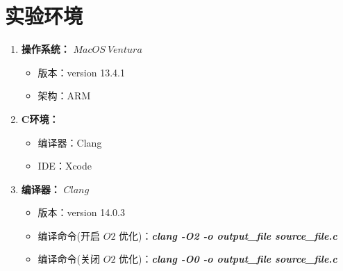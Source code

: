 \section{实验环境}
\begin{enumerate}
    \item \textbf{操作系统：} $MacOS \ Ventura$
    \begin{itemize}
        \item 版本：version 13.4.1
        \item 架构：ARM
    \end{itemize}
    \item \textbf{C环境：}
    \begin{itemize}
        \item 编译器：Clang
        \item IDE：Xcode
    \end{itemize}
    \item \textbf{编译器：} $Clang$
    \begin{itemize}
        \item 版本：version 14.0.3
        \item 编译命令(开启 $O2$ 优化)：\textbf{\textit{clang -O2 -o output\_file source\_file.c}}
        \item 编译命令(关闭 $O2$ 优化)：\textbf{\textit{clang -O0 -o output\_file source\_file.c}}
    \end{itemize}
\end{enumerate}